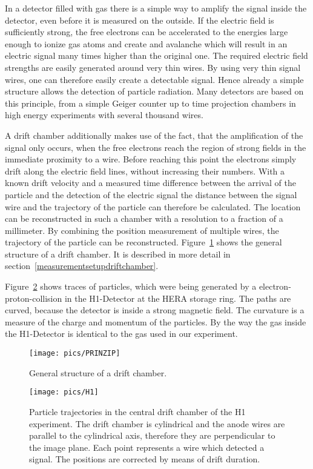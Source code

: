 \documentclass[12pt]{article}
\begin{document}
In a detector filled with gas there is a simple way to amplify the signal inside the detector, even before it is measured on the outside. If the electric field is sufficiently strong, the free electrons can be accelerated to the energies large enough to ionize gas atoms and create and avalanche which will result in an electric signal many times higher than the original one. The required electric field strengths are easily generated around very thin wires. By using very thin signal wires, one can therefore easily create a detectable signal. Hence already a simple structure allows the detection of particle radiation. Many detectors are based on this principle, from a simple Geiger counter up to time projection chambers in high energy experiments with several thousand wires. 

A drift chamber additionally makes  use of the fact, that the amplification of the signal only occurs, when the free electrons reach the region of strong fields in the immediate proximity to a wire. Before reaching this point the electrons simply drift along the electric field lines, without increasing their numbers. With a known drift velocity and a measured time difference between the arrival of the particle and the detection of the electric signal the distance between the signal wire and the trajectory of the particle can therefore be calculated. The location can be reconstructed in such a chamber with a resolution to a fraction of a millimeter. By combining the position measurement of multiple wires, the trajectory of the particle can be reconstructed. Figure~\ref{fig:structure} shows the general structure of a drift chamber. It is described in more detail in section~\ref{measurementsetupdriftchamber}.


Figure~\ref{fig:H1_detector} shows traces of particles, which were being generated by a electron-proton-collision in the H1-Detector at the HERA storage ring. The paths are curved, because the detector is inside a strong magnetic field. The curvature is a measure of the charge and momentum of the particles. By the way the gas inside the H1-Detector is identical to the gas used in our experiment. 

\begin{figure}[h]
\texttt{[image: pics/PRINZIP]}
\centering
\caption{General structure of a drift chamber.}
\label{fig:structure}
\end{figure}

\newpage

\begin{figure}[!h]
\texttt{[image: pics/H1]}
\centering
\caption{Particle trajectories in the central drift chamber of the H1 experiment. The drift chamber is cylindrical and the anode wires are parallel to the cylindrical axis, therefore they are perpendicular to the image plane. Each point represents a wire which detected a signal. The positions are corrected by means of drift duration.}
\label{fig:H1_detector}
\end{figure}
\end{document}
